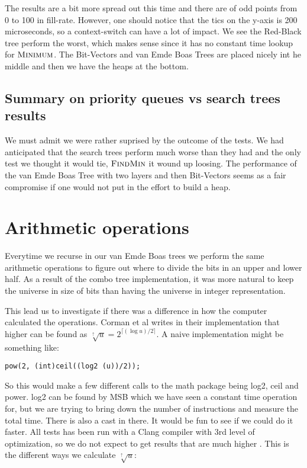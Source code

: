 \documentclass[oneside,11pt,openright]{report}
\newcommand{\FindMin}{\textsc{FindMin}}
\newcommand{\Minimum}{\textsc{Minimum}}
\newcommand{\HIGHER}{\sqrt[\uparrow]{u}}
\begin{document}


The results are a bit more spread out this time and there are of odd points from 0 to 100 in fill-rate. However, one should notice that the tics on the y-axis is 200 microseconds, so a context-switch can have a lot of impact. We see the Red-Black tree perform the worst, which makes sense since it has no constant time lookup for $\Minimum$. The Bit-Vectors and van Emde Boas Trees are placed nicely int he middle and then we have the heaps at the bottom.

\section{Summary on priority queues vs search trees results}

We must admit we were rather suprised by the outcome of the tests. We had anticipated that the search trees perform much worse than they had and the only test we thought it would tie, $\FindMin$ it wound up loosing. The performance of the van Emde Boas Tree with two layers and then Bit-Vectors seems as a fair compromise if one would not put in the effort to build a heap.


\chapter{Arithmetic operations}

Everytime we recurse in our van Emde Boas trees we perform the same arithmetic operations to figure out where to divide the bits in an upper and lower half. As a result of the combo tree implementation, it was more natural to keep the universe in size of bits than having the universe in integer representation. 

This lead us to investigate if there was a difference in how the computer calculated the operations. Corman et al writes in their implementation that higher can be found as $\HIGHER = 2^{\lceil{(\log u)/2}\rceil}$. A naive implementation might be something like:
\begin{lstlisting}
pow(2, (int)ceil((log2 (u))/2));
\end{lstlisting}

So this would make a few different calls to the math package being log2, ceil and power. log2 can be found by MSB which we have seen a constant time operation for, but we are trying to bring down the number of instructions and measure the total time. There is also a cast in there. It would be fun to see if we could do it faster. All tests has been run with a Clang compiler with 3rd level of optimization, so we do not expect to get results that are much higher . This is the different ways we calculate $\HIGHER$:
\end{document}
